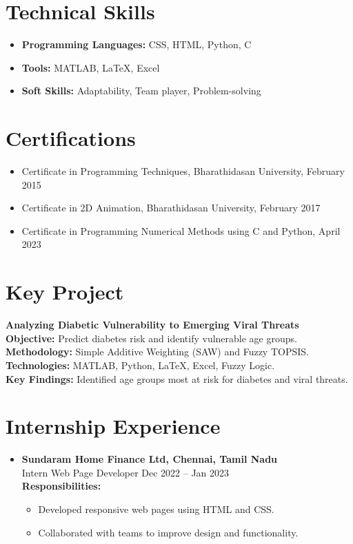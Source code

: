 \documentclass[a4paper,10pt]{article}
\begin{document}
\section*{Technical Skills}
\begin{itemize}[leftmargin=1.5cm]
    \item \textbf{Programming Languages:} CSS, HTML, Python, C
    \item \textbf{Tools:} MATLAB, LaTeX, Excel
    \item \textbf{Soft Skills:} Adaptability, Team player, Problem-solving
\end{itemize}

\section*{Certifications}
\begin{itemize}[leftmargin=1.5cm]
    \item Certificate in Programming Techniques, Bharathidasan University, February 2015
    \item Certificate in 2D Animation, Bharathidasan University, February 2017
    \item Certificate in Programming Numerical Methods using C and Python, April 2023
\end{itemize}

\section*{Key Project}
\textbf{Analyzing Diabetic Vulnerability to Emerging Viral Threats} \\
\textbf{Objective:} Predict diabetes risk and identify vulnerable age groups. \\
\textbf{Methodology:} Simple Additive Weighting (SAW) and Fuzzy TOPSIS. \\
\textbf{Technologies:} MATLAB, Python, LaTeX, Excel, Fuzzy Logic. \\
\textbf{Key Findings:} Identified age groups most at risk for diabetes and viral threats.

\section*{Internship Experience}
\begin{itemize}[leftmargin=1.5cm]
    \item \textbf{Sundaram Home Finance Ltd, Chennai, Tamil Nadu} \\
    Intern Web Page Developer \hfill Dec 2022 -- Jan 2023 \\
    \textbf{Responsibilities:}
    \begin{itemize}[leftmargin=1cm]
        \item Developed responsive web pages using HTML and CSS.
        \item Collaborated with teams to improve design and functionality.
    \end{itemize}
\end{itemize}
\end{document}
